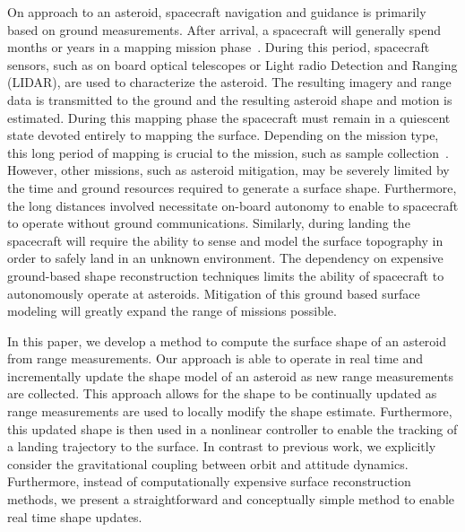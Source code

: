 \documentclass[letterpaper, paper,11pt]{AAS}		%
\begin{document}
On approach to an asteroid, spacecraft navigation and guidance is primarily based on ground measurements.
After arrival, a spacecraft will generally spend months or years in a mapping mission phase~\cite{kubota2003,cole1998}.
During this period, spacecraft sensors, such as on board optical telescopes or Light radio Detection and Ranging (LIDAR), are used to characterize the asteroid.
The resulting imagery and range data is transmitted to the ground and the resulting asteroid shape and motion is estimated. 
During this mapping phase the spacecraft must remain in a quiescent state devoted entirely to mapping the surface.
Depending on the mission type, this long period of mapping is crucial to the mission, such as sample collection~\cite{gates2015}. 
However, other missions, such as asteroid mitigation, may be severely limited by the time and ground resources required to generate a surface shape.
Furthermore, the long distances involved necessitate on-board autonomy to enable to spacecraft to operate without ground communications.
Similarly, during landing the spacecraft will require the ability to sense and model the surface topography in order to safely land in an unknown environment.
The dependency on expensive ground-based shape reconstruction techniques limits the ability of spacecraft to autonomously operate at asteroids.
Mitigation of this ground based surface modeling will greatly expand the range of missions possible.

In this paper, we develop a method to compute the surface shape of an asteroid from range measurements.
Our approach is able to operate in real time and incrementally update the shape model of an asteroid as new range measurements are collected.
This approach allows for the shape to be continually updated as range measurements are used to locally modify the shape estimate.
Furthermore, this updated shape is then used in a nonlinear controller to enable the tracking of a landing trajectory to the surface.
In contrast to previous work, we explicitly consider the gravitational coupling between orbit and attitude dynamics.
Furthermore, instead of computationally expensive surface reconstruction methods, we present a straightforward and conceptually simple method to enable real time shape updates. 


\end{document}
